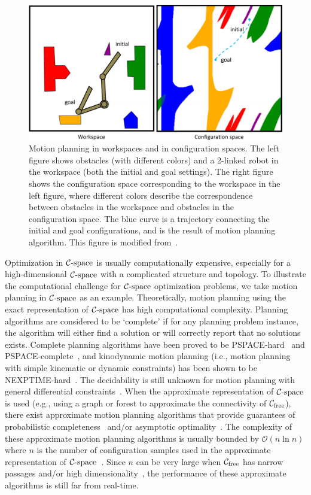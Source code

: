 \begin{figure}[!htb]
  \centering
  \includegraphics[width=\linewidth]{figs/1/planning-crop.pdf}
  \caption[Motion planning in workspaces and in configuration spaces]{Motion planning in workspaces and in configuration spaces. The left figure shows obstacles (with different colors) and a 2-linked robot in the workspace (both the initial and goal settings). The right figure shows the configuration space corresponding to the workspace in the left figure, where different colors describe the correspondence between obstacles in the workspace and obstacles in the configuration space. The blue curve is a trajectory connecting the initial and goal configurations, and is the result of motion planning algorithm. This figure is modified from~\cite{cspaceJapplet}. \label{fig:1:planning}}
\end{figure}


Optimization in $\mathcal C\text{-space}$ is usually computationally expensive, especially for a high-dimensional $\mathcal C\text{-space}$ with a complicated structure and topology. To illustrate the computational challenge for $\mathcal C\text{-space}$ optimization problems, we take motion planning in $\mathcal C\text{-space}$ as an example. Theoretically, motion planning using the exact representation of $\mathcal C\text{-space}$ has high computational complexity. Planning algorithms are considered to be `complete' if for any planning problem instance, the algorithm will either find a solution or will correctly report that no solutions exists. Complete planning algorithms have been proved to be PSPACE-hard~\cite{Reif:1979:CMP} and PSPACE-complete~\cite{Canny:1988:AGC}, and kinodynamic motion planning (i.e., motion planning with simple kinematic or dynamic constraints) has been shown to be NEXPTIME-hard~\cite{Canny:1988:CKP}. 
The decidability is still unknown for motion planning with general differential constraints~\cite{Cheng:2007:DMP}. When the approximate representation of $\mathcal C\text{-space}$ is used (e.g., using a graph or forest to approximate the connectivity of $\mathcal C_{\text{free}}$), there exist approximate motion planning algorithms that provide guarantees of probabilistic completeness~\cite{Kavraki96,Kuffner00} and/or asymptotic optimality~\cite{Sertac:IJRR:2011}. The complexity of these approximate motion planning algorithms is usually bounded by $\mathcal O(n\ln n)$ where $n$ is the number of configuration samples used in the approximate representation of $\mathcal C\text{-space}$~\cite{Sertac:IJRR:2011}. Since $n$ can be very large when $\mathcal C_{\text{free}}$ has narrow passages and/or high dimensionality~\cite{Hsu:2006:ijrr}, the performance of these approximate algorithms is still far from real-time.

